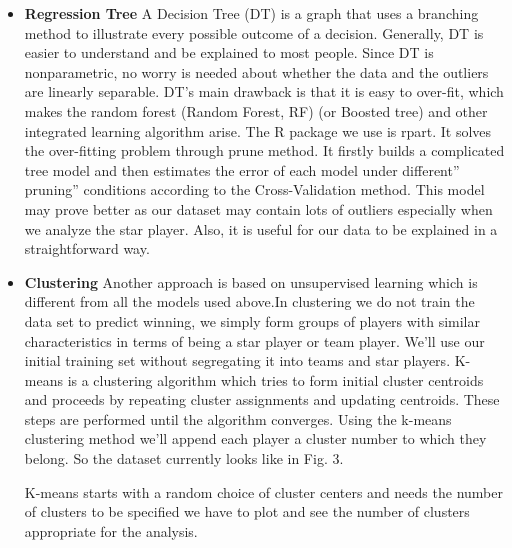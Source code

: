 \documentclass[conference]{IEEEtran}
\begin{document}
\begin{itemize}
  \item \textbf{Regression Tree}
A Decision Tree (DT) is a graph that uses a branching method to illustrate every possible outcome of a decision. Generally, DT is easier to understand and be explained to most people. Since DT is nonparametric, no worry is needed about whether the data and the outliers are linearly separable. DT’s main drawback is that it is easy to over-fit, which makes the random forest (Random Forest, RF) (or Boosted tree) and other integrated learning algorithm arise. The R package we use is rpart. It solves the over-fitting problem through prune method. It firstly builds a complicated tree model and then estimates the error of each model under different” pruning” conditions according to the Cross-Validation method. This model may prove better as our dataset may contain lots of outliers especially when we analyze the star player. Also, it is useful for our data to be explained in a straightforward way.

  \item \textbf{Clustering}
Another approach is based on unsupervised learning which is different from all the models used above.In clustering we do not train the data set to predict winning, we simply form groups of players with similar characteristics in terms of being a star player or team player. We’ll use our initial training set without segregating it into teams and star players. K-means is a clustering algorithm which tries to form initial cluster centroids and proceeds by repeating cluster assignments and updating centroids. These steps are performed until the algorithm converges. Using the k-means clustering method we’ll append each player a cluster number to which they belong. 
So the dataset currently looks like in Fig. 3.


 K-means starts with a random choice of cluster centers and needs the number of clusters to be specified we have to plot and see the number of clusters appropriate for the analysis.


\end{itemize}
\end{document}
